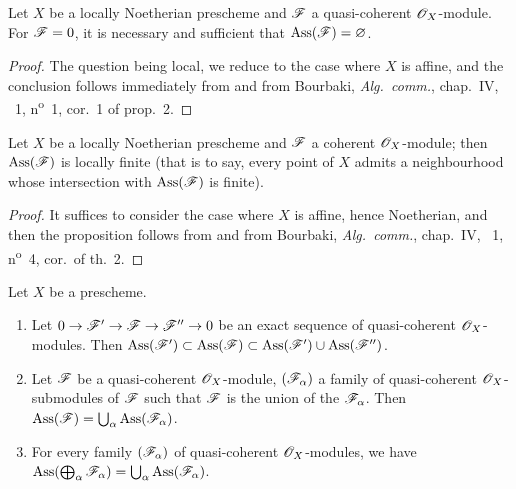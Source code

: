 \begin{corollary}[3.1.5]
\label{IV.3.1.5}
Let $X$ be a locally Noetherian prescheme and $\mathscr{F}$ a quasi-coherent $\mathscr{O}_X$-module.
For $\mathscr{F}=0$, it is necessary and sufficient that $\operatorname{Ass}(\mathscr{F})=\varnothing$.
\end{corollary}

\begin{proof}
The question being local, we reduce to the case where $X$ is affine, and the conclusion follows immediately from  and from Bourbaki, \emph{Alg.\ comm.}, chap.~IV, \textsection~1, n\textsuperscript{o}~1, cor.~1 of prop.~2.
\end{proof}

\begin{proposition}[3.1.6]
\label{IV.3.1.6}
Let $X$ be a locally Noetherian prescheme and $\mathscr{F}$ a coherent $\mathscr{O}_X$-module; then $\operatorname{Ass}(\mathscr{F})$ is locally finite \textup{(that is to say, every point of $X$ admits a neighbourhood whose intersection with $\operatorname{Ass}(\mathscr{F})$ is finite)}.
\end{proposition}

\begin{proof}
It suffices to consider the case where $X$ is affine, hence Noetherian, and then the proposition follows from  and from Bourbaki, \emph{Alg.\ comm.}, chap.~IV, \textsection~1, n\textsuperscript{o}~4, cor.\ of th.~2.
\end{proof}

\begin{proposition}[3.1.7]
\label{IV.3.1.7}
Let $X$ be a prescheme.
\begin{enumerate}
  \item[(i)] Let $0\to\mathscr{F}'\to\mathscr{F}\to\mathscr{F}''\to 0$ be an exact sequence of quasi-coherent $\mathscr{O}_X$-modules.
  Then $\operatorname{Ass}(\mathscr{F}')\subset\operatorname{Ass}(\mathscr{F})\subset\operatorname{Ass}(\mathscr{F}')\cup\operatorname{Ass}(\mathscr{F}'')$.
  \item[(ii)] Let $\mathscr{F}$ be a quasi-coherent $\mathscr{O}_X$-module, $(\mathscr{F}_\alpha)$ a family of quasi-coherent $\mathscr{O}_X$-submodules of $\mathscr{F}$ such that $\mathscr{F}$ is the union of the $\mathscr{F}_\alpha$.
  Then $\operatorname{Ass}(\mathscr{F})=\bigcup_\alpha\operatorname{Ass}(\mathscr{F}_\alpha)$.
  \item[(iii)] For every family $(\mathscr{F}_\alpha)$ of quasi-coherent $\mathscr{O}_X$-modules, we have $\operatorname{Ass}(\bigoplus_\alpha\mathscr{F}_\alpha)=\bigcup_\alpha\operatorname{Ass}(\mathscr{F}_\alpha)$.
\end{enumerate}
\end{proposition}

